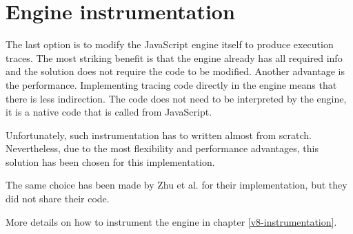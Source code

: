 \section{Engine instrumentation}
The last option is to modify the JavaScript engine itself to produce execution traces.
The most striking benefit is that the engine already has all required info and the solution does not require the code
to be modified.
Another advantage is the performance. Implementing tracing code directly in the engine means 
that there is less indirection. The code does not need to be interpreted by the engine, it is a native code
that is called from JavaScript.

Unfortunately, such instrumentation has to written almost from scratch. 
Nevertheless, due to the most flexibility and performance advantages, this solution has been chosen 
for this implementation.

The same choice has been made by Zhu et al. \cite{DBLP:conf/ndss/ZhuHQSY18} for their implementation, but they did not share their code.

More details on how to instrument the engine in chapter \ref{v8-instrumentation}.

